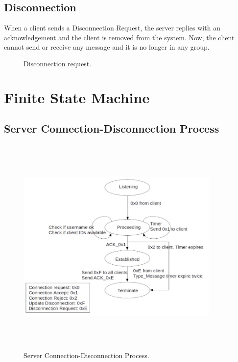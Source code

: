 \documentclass{article}
\begin{document}
\subsection{Disconnection}
When a client sends a Disconnection Request, the server replies with an acknowledgement and the client is removed from the system. Now, the client cannot send or receive any message and it is no longer in any group.
\begin{figure}[h]
    \centering
    \begin{sequencediagram}

    \end{sequencediagram}
    \caption{Disconnection request.}
\end{figure}

\section{Finite State Machine}

\subsection{Server Connection-Disconnection Process}
\begin{figure}[H]
\centering
\includegraphics[width=10cm, height=11cm]{Connection-disconnectionFSM.jpg}
\caption{Server Connection-Disconnection Process.}
\label{fig:{Connection-disconnectionFSM}}
\end{figure}
\end{document}
